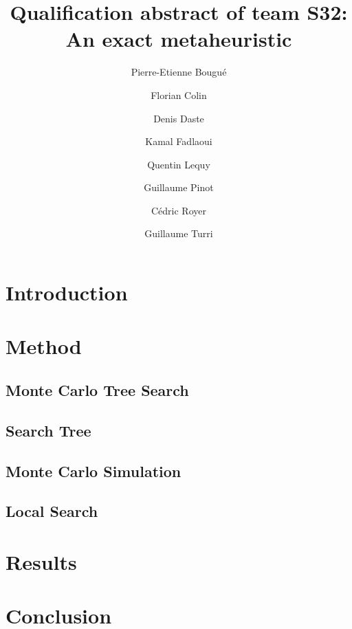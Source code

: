 \documentclass[a4paper]{article}
\title{Qualification abstract of team S32:\\
  An exact metaheuristic}
\author{Pierre-Etienne Bougué \and Florian Colin \and Denis Daste
  \and Kamal Fadlaoui \and Quentin Lequy \and Guillaume Pinot \and
  Cédric Royer \and Guillaume Turri}
\begin{document}
\maketitle

\section{Introduction}

\section{Method}

\subsection{Monte Carlo Tree Search}

\subsection{Search Tree}

\subsection{Monte Carlo Simulation}

\subsection{Local Search}

\section{Results}

\section{Conclusion}


\end{document}
